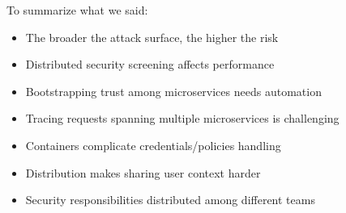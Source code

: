 \documentclass[10pt,a4paper]{report}
\begin{document}
To summarize what we said:
\begin{itemize}
	\item The broader the attack surface, the higher the risk
	\item Distributed security screening affects performance
	\item Bootstrapping trust among microservices needs automation
	\item Tracing requests spanning multiple microservices is challenging
	\item Containers complicate credentials/policies handling
	\item Distribution makes sharing user context harder
	\item Security responsibilities distributed among different teams
\end{itemize} 
\end{document}
